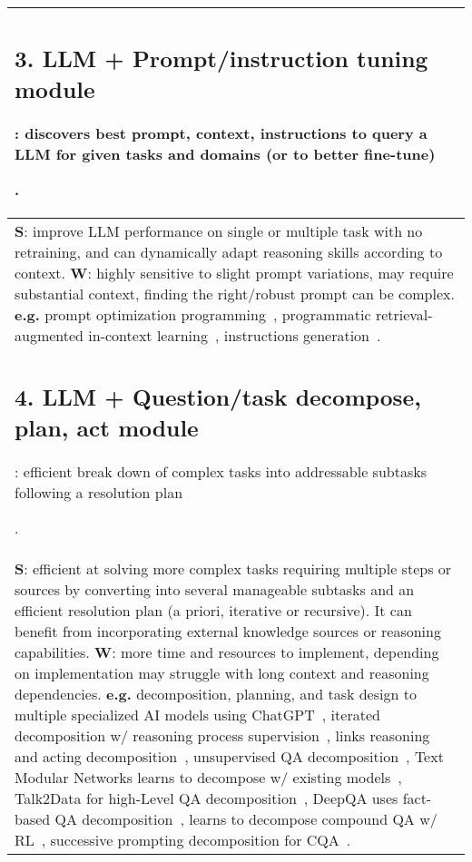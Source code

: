 \documentclass[acmsmall]{acmart}
\begin{document}
{\begin{longtable}{p{1\linewidth}}
{\subsection{3. LLM + Prompt/instruction tuning module}\label{HP3}:
discovers best prompt, context, instructions to query a LLM for given tasks and domains (or to better fine-tune)}. \\\midrule
{\textbf{S}: improve LLM performance on single or multiple task with no retraining, and can dynamically adapt reasoning skills according to context.
 \newline \textbf{W}:} highly sensitive to slight prompt variations, may require substantial context, finding the right/robust prompt can be complex.
 \newline \textbf{e.g.} prompt optimization programming~\citep{beurer-kellnerPromptingProgrammingQuery2022}, programmatic retrieval-augmented in-context learning~\citep{khattabDemonstrateSearchPredictComposingRetrieval2023}, instructions generation~\citep{wangSelfInstructAligningLanguage2022}. \\\midrule

{\subsection{4. LLM + Question/task decompose, plan, act module}\label{HP4}:
efficient break down of complex tasks into addressable subtasks following a resolution plan}. \\\midrule  
{\textbf{S}: efficient at solving more complex tasks requiring multiple steps or sources by converting into several manageable subtasks and an efficient resolution plan (a priori, iterative or recursive). It can benefit from incorporating external knowledge sources or reasoning capabilities.
\newline \textbf{W}:} more time and resources to implement, depending on implementation may struggle with long context and reasoning dependencies.
\newline \textbf{e.g.} decomposition, planning, and task design to multiple specialized AI models using ChatGPT~\citep{shenHuggingGPTSolvingAI2023}, iterated decomposition w/ reasoning process supervision~\citep{reppertIteratedDecompositionImproving2023}, links reasoning and acting decomposition~\citep{yaoReActSynergizingReasoning2022},
unsupervised QA decomposition~\citep{perezUnsupervisedQuestionDecomposition2020}, Text Modular Networks learns to decompose w/ existing models~\citep{khotTextModularNetworks2021}, Talk2Data for high-Level QA decomposition~\citep{shiTalk2DataHighLevelQuestion2021},
DeepQA uses fact-based QA decomposition~\citep{kalyanpurFactbasedQuestionDecomposition2012}, learns to decompose compound QA w/ RL~\citep{yangLearningDecomposeCompound2018}, successive prompting decomposition for CQA~\citep{duaSuccessivePromptingDecomposing2022}. \\\midrule


\end{longtable}}
\end{document}
